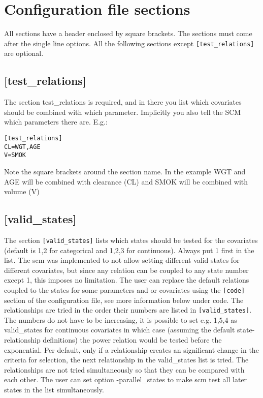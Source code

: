 \section{Configuration file sections}
All sections have a header enclosed by square brackets. The sections must come after the single line options. All the following sections except 
\verb|[test_relations]| 
are optional. 

\subsection{[test\_relations]}
The section test\_relations is required, and in there you list which covariates should be combined with which parameter. Implicitly you also tell the SCM which parameters there are. E.g.:

\begin{verbatim}
[test_relations]
CL=WGT,AGE
V=SMOK
\end{verbatim}

Note the square brackets around the section name. In the example WGT and AGE will be combined with clearance (CL) and SMOK will be combined with volume (V)

\subsection{[valid\_states]}
The section 
\verb|[valid_states]| 
lists which states should be tested for the covariates (default is 1,2 for categorical and 1,2,3 for continuous). Always put 1 first in the list. The scm was implemented to not allow setting different valid states for different covariates, but since any relation can be coupled to any state number except 1, this imposes no limitation. The user can replace the default relations coupled to the states for some parameters and or covariates using the 
\verb|[code]| 
section of the configuration file, see more information below under code. The relationships are tried in the order their numbers are listed in 
\verb|[valid_states]|. 
The numbers do not have to be increasing, it is possible to set e.g. 1,5,4 as valid\_states for continuous covariates in which case (assuming the default state-relationship definitions) the power relation would be tested before the exponential. Per default, only if a relationship creates an significant change in the criteria for selection, the next relationship in the valid\_states list is tried. The relationships are not tried simultaneously so that they can be compared with each other. The user can set option -parallel\_states to make scm test all later states in the list simultaneously.

